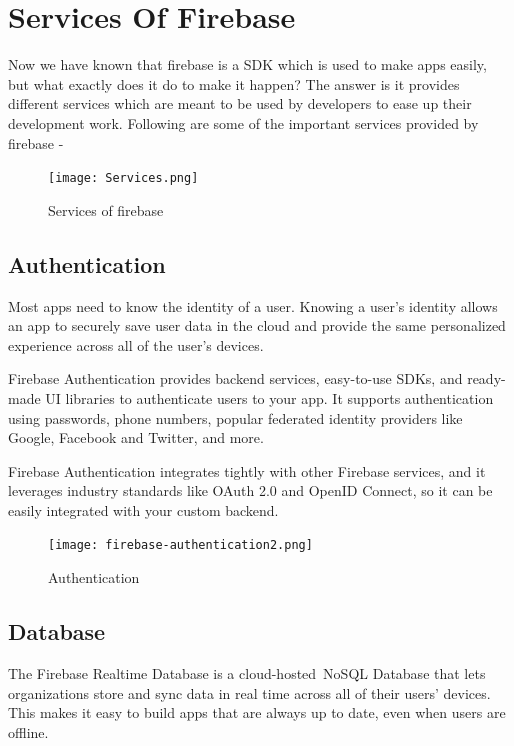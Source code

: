 \documentclass[12pt,a4paper]{report}
\begin{document}
\chapter{\fontsize{18}{0}\selectfont Services Of Firebase}
{\fontsize{14}{0}\selectfont
\noindent
  Now we have known that firebase is a SDK which is used to make apps easily, but what exactly does it do to make it happen? The answer is it provides different services which are meant to be used by developers to ease up their development work. Following are some of the important services provided by firebase - 
  \vspace{2cm}
\begin{figure}[ht]
    \centering
    \texttt{[image: Services.png]}
    \vspace{1cm}
    \caption{\fontsize{12}{0}\selectfont Services of firebase}
    \label{fig:services}
\end{figure}
\newpage

\section{{\fontsize{16}{0}\selectfont Authentication}}
{\fontsize{14}{0}\selectfont
\noindent
Most apps need to know the identity of a user. Knowing a user's identity allows an app to securely save user data in the cloud and provide the same personalized experience across all of the user's devices.

\hspace{1cm}Firebase Authentication provides backend services, easy-to-use \ac{SDK}s, and ready-made \ac{UI} libraries to authenticate users to your app. It supports authentication using passwords, phone numbers, popular federated identity providers like Google, Facebook and Twitter, and more.

\hspace{1cm}Firebase Authentication integrates tightly with other Firebase services, and it leverages industry standards like OAuth 2.0 and OpenID Connect, so it can be easily integrated with your custom backend.

\begin{figure}[ht]
    \centering
    \texttt{[image: firebase-authentication2.png]}
    \vspace{1cm}
    \caption{\fontsize{12}{0}\selectfont Authentication}
    \label{fig:auth}
\end{figure}
}


\section{{\fontsize{16}{0}\selectfont Database}}
{\fontsize{14}{0}\selectfont
\noindent
The Firebase Realtime Database is a cloud-hosted NoSQL Database that lets organizations store and sync data in real time across all of their users' devices. This makes it easy to build apps that are always up to date, even when users are offline.
}
}
\end{document}
